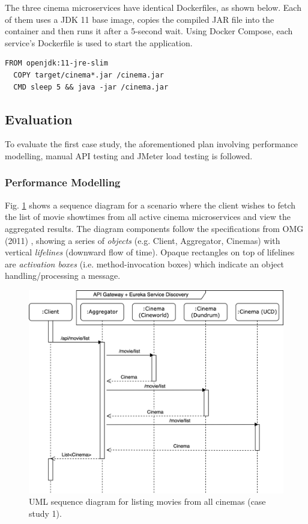 The three cinema microservices have identical Dockerfiles, as shown below. Each of them uses a JDK 11 base image, copies the compiled JAR file into the container and then runs it after a 5-second wait. Using Docker Compose, each service's Dockerfile is used to start the application.

\begin{lstlisting}[caption=Dockerfile for cinema services.]
  FROM openjdk:11-jre-slim
  COPY target/cinema*.jar /cinema.jar
  CMD sleep 5 && java -jar /cinema.jar
\end{lstlisting}


\subsection{Evaluation}

To evaluate the first case study, the aforementioned plan involving performance modelling, manual API testing and JMeter load testing is followed.

\subsubsection{Performance Modelling}

Fig. \ref{fig:cs01-sequence} shows a sequence diagram for a scenario where the client wishes to fetch the list of movie showtimes from all active cinema microservices and view the aggregated results. The diagram components follow the specifications from OMG (2011) \cite{omg11}, showing a series of \textit{objects} (e.g. Client, Aggregator, Cinemas) with vertical \textit{lifelines} (downward flow of time). Opaque rectangles on top of lifelines are \textit{activation boxes} (i.e. method-invocation boxes) which indicate an object handling/processing a message.

\begin{figure}[H]
  \centering
  \includegraphics[width=0.75\linewidth]{./assets/diagrams/cs01-sequence.png}
  \caption{UML sequence diagram for listing movies from all cinemas (case study 1).}
  \label{fig:cs01-sequence}
\end{figure}

